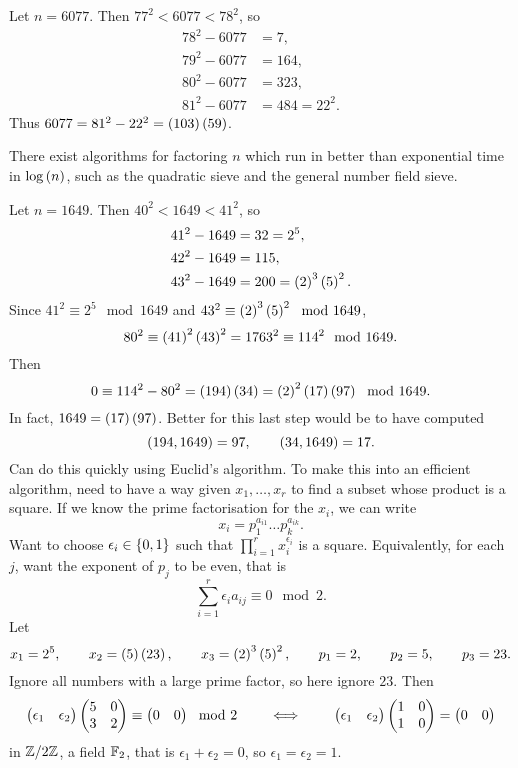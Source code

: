 \begin{example*}
Let $ n = 6077 $. Then $ 77^2 < 6077 < 78^2 $, so
\begin{align*}
78^2 - 6077 & = 7, \\
79^2 - 6077 & = 164, \\
80^2 - 6077 & = 323, \\
81^2 - 6077 & = 484 = 22^2.
\end{align*}
Thus $ 6077 = 81^2 - 22^2 = \br{103}\br{59} $.
\end{example*}

\pagebreak

There exist algorithms for factoring $ n $ which run in better than exponential time in $ \log\br{n} $, such as the quadratic sieve and the general number field sieve.

\begin{example*}
Let $ n = 1649 $. Then $ 40^2 < 1649 < 41^2 $, so
\begin{align*}
41^2 - 1649 & = 32 = 2^5, \\
42^2 - 1649 & = 115, \\
43^2 - 1649 & = 200 = \br{2}^3\br{5}^2.
\end{align*}
Since $ 41^2 \equiv 2^5 \mod 1649 $ and $ 43^2 \equiv \br{2}^3\br{5}^2 \mod 1649 $,
$$ 80^2 \equiv \br{41}^2\br{43}^2 = 1763^2 \equiv 114^2 \mod 1649. $$
Then
$$ 0 \equiv 114^2 - 80^2 = \br{194}\br{34} = \br{2}^2\br{17}\br{97} \mod 1649. $$
In fact, $ 1649 = \br{17}\br{97} $. Better for this last step would be to have computed
$$ \br{194, 1649} = 97, \qquad \br{34, 1649} = 17. $$
Can do this quickly using Euclid's algorithm. To make this into an efficient algorithm, need to have a way given $ x_1, \dots, x_r $ to find a subset whose product is a square. If we know the prime factorisation for the $ x_i $, we can write
$$ x_i = p_1^{a_{i1}} \dots p_k^{a_{ik}}. $$
Want to choose $ \epsilon_i \in \cbr{0, 1} $ such that $ \prod_{i = 1}^r x_i^{\epsilon_i} $ is a square. Equivalently, for each $ j $, want the exponent of $ p_j $ to be even, that is
$$ \sum_{i = 1}^r \epsilon_ia_{ij} \equiv 0 \mod 2. $$
Let
$$ x_1 = 2^5, \qquad x_2 = \br{5}\br{23}, \qquad x_3 = \br{2}^3\br{5}^2, \qquad p_1 = 2, \qquad p_2 = 5, \qquad p_3 = 23. $$
Ignore all numbers with a large prime factor, so here ignore $ 23 $. Then
$$ \begin{pmatrix} \epsilon_1 & \epsilon_2 \end{pmatrix}\begin{pmatrix} 5 & 0 \\ 3 & 2 \end{pmatrix} \equiv \begin{pmatrix} 0 & 0 \end{pmatrix} \mod 2 \qquad \iff \qquad \begin{pmatrix} \epsilon_1 & \epsilon_2 \end{pmatrix}\begin{pmatrix} 1 & 0 \\ 1 & 0 \end{pmatrix} = \begin{pmatrix} 0 & 0 \end{pmatrix} $$
in $ \mathbb{Z} / 2\mathbb{Z} $, a field $ \mathbb{F}_2 $, that is $ \epsilon_1 + \epsilon_2 = 0 $, so $ \epsilon_1 = \epsilon_2 = 1 $.
\end{example*}

